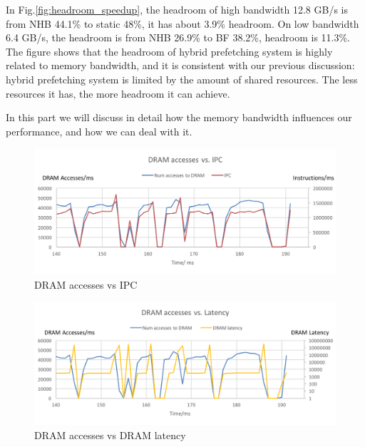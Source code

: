   \label{sec:memorybandwidhissue}
  In Fig.\ref{fig:headroom_speedup}, the headroom of high bandwidth 12.8 GB/s is from NHB 44.1\% to static 48\%, it has about 3.9\% headroom. On low bandwidth 6.4 GB/s, the headroom is from NHB 26.9\% to BF 38.2\%, headroom is 11.3\%.
  The figure shows that the headroom of hybrid prefetching system is highly related to memory bandwidth, and it is consistent with our previous discussion: hybrid prefetching system is limited by the amount of shared resources.
  The less resources it has, the more headroom it can achieve.\par
  In this part we will discuss in detail how the memory bandwidth influences our performance, and how we can deal with it.\par

    \begin{figure}[ht!]
	   \centering
	   \includegraphics[width=1.0\textwidth]{images/bandwidth_IPC.png}
	   \caption{DRAM accesses vs IPC}
	  \label{fig:bandwidth_IPC}
  \end{figure}
  \begin{figure}[ht!]
	   \centering
	   \includegraphics[width=1.0\textwidth]{images/bandwidth_latency.png}
	   \caption{DRAM accesses vs DRAM latency}
	  \label{fig:bandwidth_latency}
  \end{figure}

